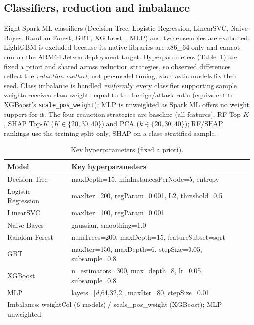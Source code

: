 \documentclass[runningheads]{llncs}
\begin{document}
\subsection{Classifiers, reduction and imbalance}
\label{sec:hparams}
Eight Spark ML classifiers (Decision Tree, Logistic Regression, LinearSVC, Naive Bayes, Random Forest, GBT, XGBoost~\cite{chen2016xgboost}, MLP) and two ensembles are evaluated. LightGBM is excluded because its native libraries are x86\_64-only and cannot run on the ARM64 Jetson deployment target. Hyperparameters (Table~\ref{tab:hparams}) are fixed a priori and shared across reduction strategies, so observed differences reflect the \emph{reduction method}, not per-model tuning; stochastic models fix their seed. Class imbalance is handled \emph{uniformly}: every classifier supporting sample weights receives class weights equal to the benign/attack ratio (equivalent to XGBoost's \texttt{scale\_pos\_weight}); MLP is unweighted as Spark ML offers no weight support for it. The four reduction strategies are baseline (all features), RF Top-$K$, SHAP Top-$K$ ($K\in\{20,30,40\}$) and PCA ($k\in\{20,30,40\}$); RF/SHAP rankings use the training split only, SHAP on a class-stratified sample.

\begin{table}[htbp]
  \caption{Key hyperparameters (fixed a priori).}
  \label{tab:hparams}
  \centering\small
  \begin{tabular}{ll}
    \toprule Model & Key hyperparameters \\ \midrule
    Decision Tree & maxDepth=15, minInstancesPerNode=5, entropy \\
    Logistic Regression & maxIter=200, regParam=0.001, L2, threshold=0.5 \\
    LinearSVC & maxIter=100, regParam=0.001 \\
    Naive Bayes & gaussian, smoothing=1.0 \\
    Random Forest & numTrees=200, maxDepth=15, featureSubset=sqrt \\
    GBT & maxIter=150, maxDepth=6, stepSize=0.05, subsample=0.8 \\
    XGBoost & n\_estimators=300, max\_depth=8, lr=0.05, subsample=0.8 \\
    MLP & layers=[$d$,64,32,2], maxIter=80, stepSize=0.01 \\ \midrule
    \multicolumn{2}{l}{Imbalance: weightCol (6 models) / scale\_pos\_weight (XGBoost); MLP unweighted.} \\
    \bottomrule
  \end{tabular}
\end{table}
\end{document}

